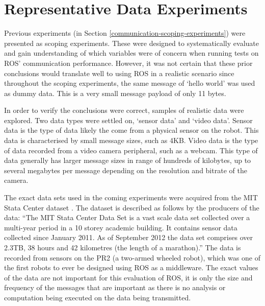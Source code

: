 \documentclass{l4proj}
\begin{document}








\section{Representative Data Experiments}
\label{communication-real-data}

Previous experiments (in Section \ref{communication-scoping-experiments}) were presented as scoping experiments. These were designed to systematically evaluate and gain understanding of which variables were of concern when running tests on ROS' communication performance. However, it was not certain that these prior conclusions would translate well to using ROS in a realistic scenario since throughout the scoping experiments, the same message of `hello world' was used as dummy data. This is a very small message payload of only 11 bytes.

In order to verify the conclusions were correct, samples of realistic data were explored. Two data types were settled on, `sensor data' and `video data'. Sensor data is the type of data likely the come from a physical sensor on the robot. This data is characterised by small message sizes, such as 4KB. Video data is the type of data recorded from a video camera peripheral, such as a webcam. This type of data generally has larger message sizes in range of hundreds of kilobytes, up to several megabytes per message depending on the resolution and bitrate of the camera.

The exact data sets used in the coming experiments were acquired from the MIT Stata Center dataset \cite{mit-stata-center-dataset}. The dataset is described as follows by the producers of the data: ``The MIT Stata Center Data Set is a vast scale data set collected over a multi-year period in a 10 storey academic building. It contains sensor data collected since January 2011. As of September 2012 the data set comprises over 2.3TB, 38 hours and 42 kilometres (the length of a marathon).''\cite{mit-stata-center-dataset} The data is recorded from sensors on the PR2 (a two-armed wheeled robot), which was one of the first robots to ever be designed using ROS as a middleware. The exact values of the data are not important for this evaluation of ROS, it is only the size and frequency of the messages that are important as there is no analysis or computation being executed on the data being transmitted.
\end{document}
